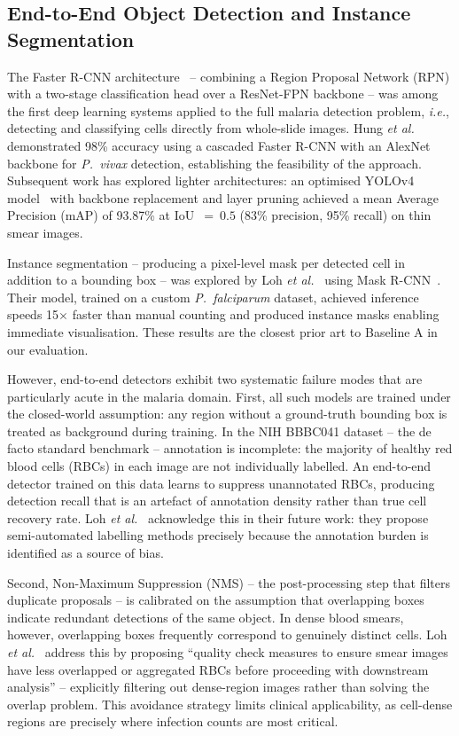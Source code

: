 \documentclass[10pt,twocolumn]{article}
\newcommand{\ie}{\textit{i.e.}}
\newcommand{\etal}{\textit{et al.}}
\begin{document}
\subsection{End-to-End Object Detection and Instance Segmentation}
\label{ssec:e2e}

The Faster R-CNN architecture~\cite{ren2015} -- combining a Region Proposal
Network (RPN) with a two-stage classification head over a ResNet-FPN
backbone -- was among the first deep learning systems applied to the
full malaria detection problem, \ie, detecting and classifying cells directly
from whole-slide images. Hung \etal~\cite{hung2018} demonstrated 98\%
accuracy using a cascaded Faster R-CNN with an AlexNet backbone for
\textit{P.~vivax} detection, establishing the feasibility of the approach.
Subsequent work has explored lighter architectures: an optimised YOLOv4
model~\cite{yolov4malaria2024} with backbone replacement and layer pruning
achieved a mean Average Precision (mAP) of 93.87\% at IoU~$=~0.5$
(83\% precision, 95\% recall) on thin smear images.

Instance segmentation -- producing a pixel-level mask per detected cell
in addition to a bounding box -- was explored by Loh \etal~\cite{loh2021}
using Mask R-CNN~\cite{he2017maskrcnn}. Their model, trained on a custom
\textit{P.~falciparum} dataset, achieved inference speeds 15$\times$ faster
than manual counting and produced instance masks enabling immediate
visualisation. These results are the closest prior art to Baseline A
in our evaluation.

However, end-to-end detectors exhibit two systematic failure modes that are
particularly acute in the malaria domain. First, all such models are
trained under the closed-world assumption: any region without a ground-truth
bounding box is treated as background during training. In the NIH BBBC041
dataset -- the de facto standard benchmark -- annotation is incomplete:
the majority of healthy red blood cells (RBCs) in each image are not
individually labelled. An end-to-end detector trained on this data
learns to suppress unannotated RBCs, producing detection recall that is
an artefact of annotation density rather than true cell recovery rate.
Loh \etal~\cite{loh2021} acknowledge this in their future work: they
propose semi-automated labelling methods precisely because the annotation
burden is identified as a source of bias.

Second, Non-Maximum Suppression (NMS) -- the post-processing step that
filters duplicate proposals -- is calibrated on the assumption that
overlapping boxes indicate redundant detections of the same object. In
dense blood smears, however, overlapping boxes frequently correspond to
genuinely distinct cells. Loh \etal~\cite{loh2021} address this by
proposing ``quality check measures to ensure smear images have less
overlapped or aggregated RBCs before proceeding with downstream
analysis'' -- explicitly filtering out dense-region images rather than
solving the overlap problem. This avoidance strategy limits clinical
applicability, as cell-dense regions are precisely where infection counts
are most critical.
\end{document}
